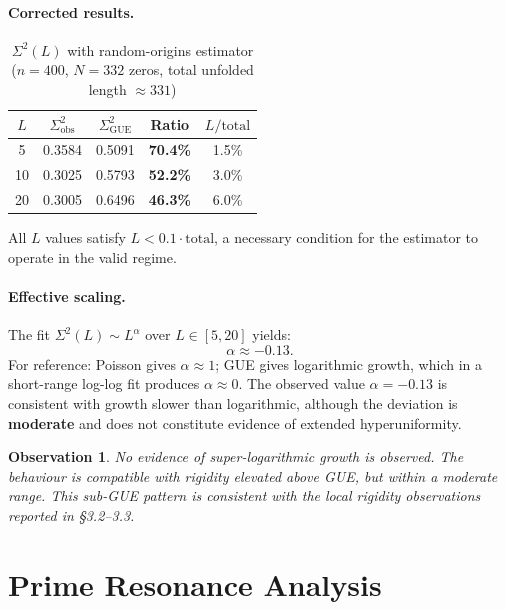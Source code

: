 \documentclass[12pt, a4paper]{article}
\newtheorem{observation}{Observation}
\begin{document}
\paragraph{Corrected results.}

\begin{table}[H]
\centering
\caption{$\Sigma^2(L)$ with random-origins estimator ($n=400$,
         $N=332$ zeros, total unfolded length $\approx 331$)}
\begin{tabular}{ccccc}
\toprule
$L$ & $\Sigma^2_{\text{obs}}$ & $\Sigma^2_{\text{GUE}}$ & Ratio & $L/\text{total}$ \\
\midrule
 5 & 0.3584 & 0.5091 & \textbf{70.4\%} & 1.5\% \\
10 & 0.3025 & 0.5793 & \textbf{52.2\%} & 3.0\% \\
20 & 0.3005 & 0.6496 & \textbf{46.3\%} & 6.0\% \\
\bottomrule
\end{tabular}
\label{tab:sigma2_robust}
\end{table}

All $L$ values satisfy $L < 0.1 \cdot \text{total}$, a necessary
condition for the estimator to operate in the valid regime.

\paragraph{Effective scaling.}
The fit $\Sigma^2(L) \sim L^{\alpha}$ over $L \in [5, 20]$ yields:
\[
  \alpha \approx -0.13.
\]
For reference: Poisson gives $\alpha \approx 1$; GUE gives logarithmic
growth, which in a short-range log-log fit produces $\alpha \approx 0$.
The observed value $\alpha = -0.13$ is consistent with growth slower
than logarithmic, although the deviation is \textbf{moderate} and does
not constitute evidence of extended hyperuniformity.

\begin{observation}
No evidence of super-logarithmic growth is observed.
The behaviour is compatible with rigidity elevated above GUE, but
within a moderate range. This sub-GUE pattern is consistent with
the local rigidity observations reported in \S3.2--3.3.
\end{observation}

\section{Prime Resonance Analysis}
\end{document}
